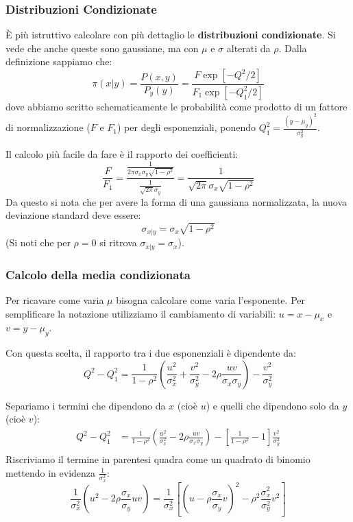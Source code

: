 \documentclass[openany,a4paper,12pt]{book}
\theoremstyle{remark}
\begin{document}
\subsubsection*{Distribuzioni Condizionate}
È più istruttivo calcolare con più dettaglio le \textbf{distribuzioni condizionate}. Si vede che anche queste sono gaussiane, ma con $\mu$ e $\sigma$ alterati da $\rho$.
Dalla definizione sappiamo che:
\begin{equation}
\pi(x|y) = \frac{P(x,y)}{P_y(y)} = \frac{F \exp[-Q^2/2]}{F_1 \exp[-Q_1^2/2]}
\end{equation}
dove abbiamo scritto schematicamente le probabilità come prodotto di un fattore di normalizzazione ($F$ e $F_1$) per degli esponenziali, ponendo $Q_1^2 = \frac{(y-\mu_y)^2}{\sigma_y^2}$.

Il calcolo più facile da fare è il rapporto dei coefficienti:
\begin{equation}
\frac{F}{F_1} = \frac{\frac{1}{2\pi\sigma_x\sigma_y\sqrt{1-\rho^2}}}{\frac{1}{\sqrt{2\pi}\sigma_y}} = \frac{1}{\sqrt{2\pi}\sigma_x\sqrt{1-\rho^2}}
\end{equation}
Da questo si nota che per avere la forma di una gaussiana normalizzata, la nuova deviazione standard deve essere:
\begin{equation}
\sigma_{x|y} = \sigma_x \sqrt{1-\rho^2}
\end{equation}
(Si noti che per $\rho = 0$ si ritrova $\sigma_{x|y} = \sigma_x$).

\subsubsection*{Calcolo della media condizionata}
Per ricavare come varia $\mu$ bisogna calcolare come varia l'esponente. Per semplificare la notazione utilizziamo il cambiamento di variabili:
$u = x - \mu_x$ e $v = y - \mu_y$.

Con questa scelta, il rapporto tra i due esponenziali è dipendente da:
\begin{equation*}
Q^2 - Q_1^2 = \frac{1}{1-\rho^2} \left( \frac{u^2}{\sigma_x^2} + \frac{v^2}{\sigma_y^2} - 2\rho\frac{uv}{\sigma_x\sigma_y} \right) - \frac{v^2}{\sigma_y^2}
\end{equation*}

Separiamo i termini che dipendono da $x$ (cioè $u$) e quelli che dipendono solo da $y$ (cioè $v$):
\begin{align*}
Q^2 - Q_1^2 &= \frac{1}{1-\rho^2} \left( \frac{u^2}{\sigma_x^2} - 2\rho\frac{uv}{\sigma_x\sigma_y} \right) - \left[ \frac{1}{1-\rho^2} - 1 \right] \frac{v^2}{\sigma_y^2} \\
\end{align*}
Riscriviamo il termine in parentesi quadra come un quadrato di binomio mettendo in evidenza $\frac{1}{\sigma_x^2}$:
\begin{equation*}
\frac{1}{\sigma_x^2} (u^2 - 2\rho\frac{\sigma_x}{\sigma_y}uv) = \frac{1}{\sigma_x^2} \left[ \left(u - \rho\frac{\sigma_x}{\sigma_y}v\right)^2 - \rho^2\frac{\sigma_x^2}{\sigma_y^2}v^2 \right]
\end{equation*}
\end{document}
